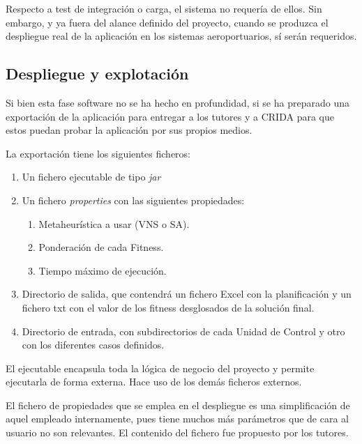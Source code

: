 Respecto a test de integración o carga, el sistema no requería de ellos. Sin embargo, y ya fuera del alance definido del proyecto, cuando se produzca el despliegue real de la aplicación en los sistemas aeroportuarios, sí serán requeridos.

\subsection{Despliegue y explotación} 
\label{sec:4:despliegue}

Si bien esta fase software no se ha hecho en profundidad, si se ha preparado una exportación de la aplicación para entregar a los tutores y a \gls{CRIDA} para que estos puedan probar la aplicación por sus propios medios.

La exportación tiene los siguientes ficheros:
\begin{enumerate}
	\item Un fichero ejecutable de tipo \textit{jar}
	\item Un fichero \textit{properties} con las siguientes propiedades:
	\begin{enumerate}[label*={\arabic*}]
		\item Metaheurística a usar (VNS o SA).
		\item Ponderación de cada Fitness.
		\item Tiempo máximo de ejecución.
	\end{enumerate}
	\item Directorio de salida, que contendrá un fichero Excel con la planificación y un fichero txt con el valor de  los fitness desglosados de la solución final.
	\item Directorio de entrada, con subdirectorios de cada Unidad de Control y otro con los diferentes casos definidos.
\end{enumerate}

El ejecutable encapsula toda la lógica de negocio del proyecto y permite ejecutarla de forma externa. Hace uso de los demás ficheros externos.

El fichero de propiedades que se emplea en el despliegue es una simplificación de aquel empleado internamente, pues tiene muchos más parámetros que de cara al usuario no son relevantes. El contenido del fichero fue propuesto por los tutores.
